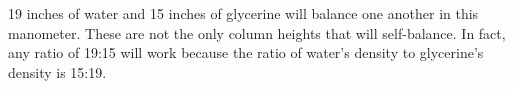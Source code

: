 
19 inches of water and 15 inches of glycerine will balance one another in this manometer.  These are not the only column heights that will self-balance.  In fact, any ratio of 19:15 will work because the ratio of water's density to glycerine's density is 15:19.










